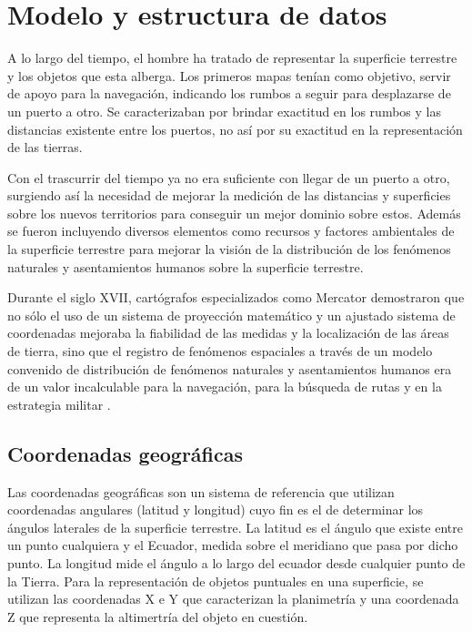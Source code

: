\section{Modelo y estructura de datos}
\label{sec:cap2-modelo-estructura-datos}

A lo largo del tiempo, el hombre ha tratado de representar la superficie terrestre y los objetos que esta alberga.
Los primeros mapas tenían como objetivo, servir de apoyo para la navegación, indicando los rumbos a seguir para
desplazarse de un puerto a otro. Se caracterizaban por brindar exactitud en los rumbos y las distancias existente 
entre los puertos, no así por su exactitud en la representación de las tierras.

Con el trascurrir del tiempo ya no era suficiente con llegar de un puerto a otro, surgiendo así la necesidad de mejorar
la medición de las distancias y superficies sobre los nuevos territorios para conseguir un mejor dominio 
sobre estos. Además se fueron incluyendo diversos elementos como recursos y factores ambientales de la superficie
terrestre para mejorar la visión de la distribución de los fenómenos naturales y asentamientos humanos sobre 
la superficie terrestre.

Durante el siglo XVII, cartógrafos especializados como Mercator demostraron que no sólo el uso de un sistema de
proyección matemático y un ajustado sistema de coordenadas mejoraba la fiabilidad de las medidas y la localización de
las áreas de tierra, sino que el registro de fenómenos espaciales a través de un modelo convenido de distribución de
fenómenos naturales y asentamientos humanos era de un valor incalculable para la navegación, para la búsqueda de rutas
y en la estrategia militar \cite{llopis2006sistemas}.

\subsection{Coordenadas geográficas}
Las coordenadas geográficas son un sistema de referencia que utilizan coordenadas angulares (latitud y longitud) 
cuyo fin es el de determinar los ángulos laterales de la superficie terrestre. La latitud es el ángulo que existe
entre un punto cualquiera y el Ecuador, medida sobre el meridiano que pasa por dicho punto. La longitud mide el ángulo 
a lo largo del ecuador desde cualquier punto de la Tierra.
Para la representación de objetos puntuales en una superficie, se utilizan las coordenadas X e Y que caracterizan la 
planimetría y una coordenada Z que representa la altimertría del objeto en cuestión. 

